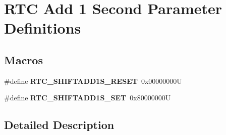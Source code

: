 \hypertarget{group___r_t_c_ex___add__1___second___parameter___definitions}{}\section{R\+TC Add 1 Second Parameter Definitions}
\label{group___r_t_c_ex___add__1___second___parameter___definitions}
\subsection*{Macros}
\begin{DoxyCompactItemize}
\item 
\mbox{\label{group___r_t_c_ex___add__1___second___parameter___definitions_gaadc96f8fbcb4a576dc126c8a78476864}} 
\#define {\bfseries R\+T\+C\+\_\+\+S\+H\+I\+F\+T\+A\+D\+D1\+S\+\_\+\+R\+E\+S\+ET}~0x00000000U
\item 
\mbox{\label{group___r_t_c_ex___add__1___second___parameter___definitions_gac22d753caa7eae6b1f4564eba3727900}} 
\#define {\bfseries R\+T\+C\+\_\+\+S\+H\+I\+F\+T\+A\+D\+D1\+S\+\_\+\+S\+ET}~0x80000000U
\end{DoxyCompactItemize}


\subsection{Detailed Description}
